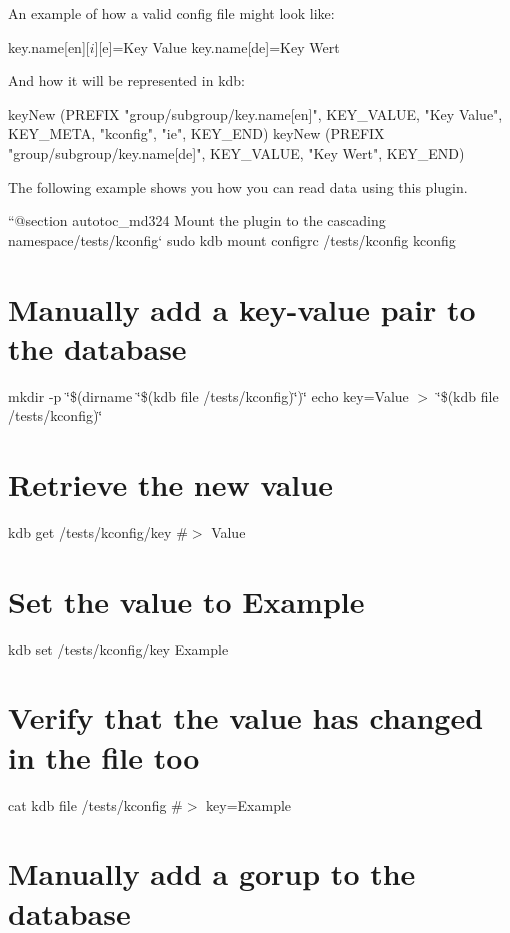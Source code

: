An example of how a valid config file might look like\+:


\begin{DoxyCode}
[group][subgroup]
key.name[en][$i][$e]=Key Value
key.name[de]=Key Wert
\end{DoxyCode}


And how it will be represented in kdb\+:


\begin{DoxyCode}
keyNew (PREFIX "group/subgroup/key.name[en]", KEY\_VALUE, "Key Value", KEY\_META, "kconfig", "ie", KEY\_END)
keyNew (PREFIX "group/subgroup/key.name[de]", KEY\_VALUE, "Key Wert", KEY\_END)
\end{DoxyCode}


The following example shows you how you can read data using this plugin.

``{\ttfamily  @section autotoc\+\_\+md324 Mount the plugin to the cascading namespace}/tests/kconfig` sudo kdb mount configrc /tests/kconfig kconfig\hypertarget{autotoc_md322_autotoc_md325}{}\section{Manually add a key-\/value pair to the database}\label{autotoc_md322_autotoc_md325}
mkdir -\/p \char`\"{}\$(dirname \char`\"{}\$(kdb file /tests/kconfig)\char`\"{})\char`\"{} echo \textquotesingle{}key=Value\textquotesingle{} $>$ \char`\"{}\$(kdb file /tests/kconfig)\char`\"{}\hypertarget{autotoc_md322_autotoc_md326}{}\section{Retrieve the new value}\label{autotoc_md322_autotoc_md326}
kdb get /tests/kconfig/key \#$>$ Value\hypertarget{autotoc_md322_autotoc_md327}{}\section{Set the value to Example}\label{autotoc_md322_autotoc_md327}
kdb set /tests/kconfig/key Example\hypertarget{autotoc_md322_autotoc_md328}{}\section{Verify that the value has changed in the file too}\label{autotoc_md322_autotoc_md328}
cat {\ttfamily kdb file /tests/kconfig} \#$>$ key=Example\hypertarget{autotoc_md322_autotoc_md329}{}\section{Manually add a gorup to the database}\label{autotoc_md322_autotoc_md329}
